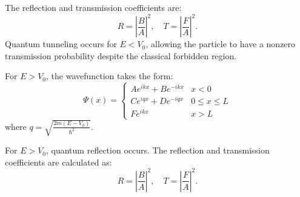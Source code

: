 \documentclass{article}
\begin{document}
The reflection and transmission coefficients are:
\[
R = \left| \frac{B}{A} \right|^2, \quad T = \left| \frac{F}{A} \right|^2.
\]
Quantum tunneling occurs for $E < V_0$, allowing the particle to have a nonzero transmission probability despite the classical forbidden region.

For $E > V_0$, the wavefunction takes the form:
\[
\Psi(x) = 
\begin{cases} 
    Ae^{ikx} + Be^{-ikx} & x < 0 \\
    C e^{iqx} + D e^{-iqx} & 0 \leq x \leq L \\
    Fe^{ikx} & x > L
\end{cases}
\]
where $q = \sqrt{\frac{2m(E - V_0)}{\hbar^2}}$.

For $E > V_0$, quantum reflection occurs. The reflection and transmission coefficients are calculated as:
\[
R = \left| \frac{B}{A} \right|^2, \quad T = \left| \frac{F}{A} \right|^2.
\]
\end{document}
